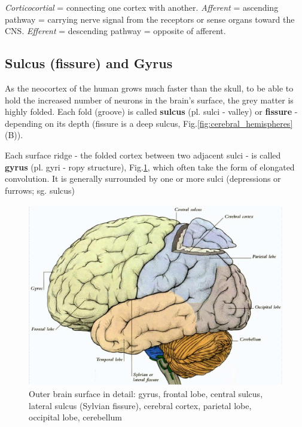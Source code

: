 \begin{mdframed}
{\it Corticocortial} = connecting one cortex with
another. {\it Afferent} = ascending pathway = carrying nerve signal from the
receptors or sense organs toward the CNS. {\it Efferent} = descending pathway = opposite of
afferent.

\end{mdframed}

\subsection{Sulcus (fissure) and Gyrus}
\label{sec:sulcus}
\label{sec:fissure}
\label{sec:gyrus}

As the neocortex of the human grows much faster than the skull, to be able to
hold the increased number of neurons in the brain's surface, the grey matter is
highly folded. Each fold (groove) is called {\bf sulcus} (pl. sulci - valley) or
{\bf fissure} - depending on its depth (fissure is a deep sulcus,
Fig.\ref{fig:cerebral_hemispheres}(B)).

Each surface ridge - the folded cortex between two adjacent sulci - is called
{\bf gyrus} (pl. gyri - ropy structure), Fig.\ref{fig:brain_cerebrum}, which
often take the form of elongated convolution. It is generally surrounded
by one or more sulci (depressions or furrows; sg. sulcus)


\begin{figure}[hbt]
  \centerline{\includegraphics[height=8cm,
    angle=0]{./images/brain_11.eps}}
\caption{Outer brain surface in detail: gyrus, frontal lobe, central sulcus,
lateral sulcus (Sylvian fissure), cerebral cortex, parietal lobe, occipital
lobe, cerebellum}
\label{fig:brain_cerebrum}
\end{figure}

